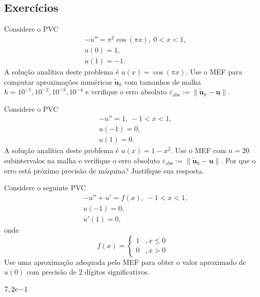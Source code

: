 \subsection{Exercícios}

\begin{exer}
  Considere o PVC
  \begin{align}
    &-u'' = \pi^2\cos(\pi x), ~0 < x < 1,\\
    &u(0) = 1,\\
    &u(1) = -1.
  \end{align}
  A solução analítica deste problema é $u(x) = \cos(\pi x)$. Use o MEF para computar aproximações numéricas $\tilde{\pmb{u}}_h$ com tamanhos de malha $h=10^{-1}, 10^{-2}, 10^{-3}, 10^{-4}$ e verifique o erro absoluto $\varepsilon_{\text{abs}} := \|\tilde{\pmb{u}}_h - \pmb{u}\|$.
\end{exer}

\begin{exer}
  Considere o PVC
  \begin{align}
    &-u'' = 1, ~-1 < x < 1,\\
    &u(-1) = 0,\\
    &u(1) = 0.
  \end{align}
  A solução analítica deste problema é $u(x) = 1-x^2$. Use o MEF com $n=20$ subintervalos na malha e verifique o erro absoluto $\varepsilon_{\text{abs}} := \|\tilde{\pmb{u}}_h - \pmb{u}\|$. Por que o erro está próximo precisão de máquina? Justifique sua resposta.
\end{exer}

\begin{exer}
Considere o seguinte PVC
\begin{subequations}
  \begin{align}
    &-u'' + u' = f(x), ~-1 < x < 1,\\
    &u(-1) = 0,\\
    &u'(1) =0,
  \end{align}
\end{subequations}
onde
\begin{equation}
  f(x) = \left\{
    \begin{array}{ll}
      1 &, x\leq 0\\
      0 &, x>0
    \end{array}
  \right.
\end{equation}
Use uma aproximação adequada pelo MEF para obter o valor aproximado de $u(0)$ com precisão de $2$ dígitos significativos.
\end{exer}
\begin{resp}
  $7,2\mathrm{e}\!-\!1$
\end{resp}

